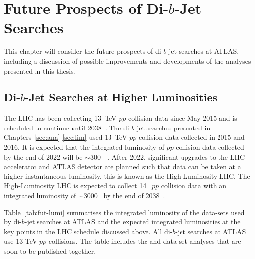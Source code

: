 \chapter{Future Prospects of Di-$b$-Jet Searches}
\label{sec:fut}

This chapter will consider the future prospects of di-$b$-jet searches at ATLAS,
including a discussion of possible improvements and developments of the analyses presented in this thesis.

\section{Di-$b$-Jet Searches at Higher Luminosities} 

The LHC has been collecting 13~TeV $pp$ collision data since May 2015 and is scheduled to continue until 2038~\cite{fut-lhc-shedule}.
The di-$b$-jet searches presented in Chapters~\ref{sec:ana}-\ref{sec:lim} used 13~TeV $pp$ collision data collected in 2015 and 2016.
It is expected that the integrated luminosity of $pp$ collision data collected by the end of 2022 will be $\sim$300~\ifb{}~\cite{fut-lhc-shedule}.
After 2022, significant upgrades to the LHC accelerator and ATLAS detector are planned such that data can be taken at a higher instantaneous luminosity,
this is known as the High-Luminosity LHC.
The High-Luminosity LHC is expected to collect 14~\TeV{} $pp$ collision data with an integrated luminosity of $\sim$3000~\ifb{} by the end of 2038~\cite{fut-lhc-shedule}.

Table~\ref{tab:fut-lumi} summarises the integrated luminosity of the data-sets used by di-$b$-jet searches
at ATLAS and the expected integrated luminosities at the key points in the LHC schedule discussed above.
All di-$b$-jet searches at ATLAS use 13 TeV $pp$ collisions.
The table includes the \lm{} and \hm{} data-set analyses that are soon to be published together.

